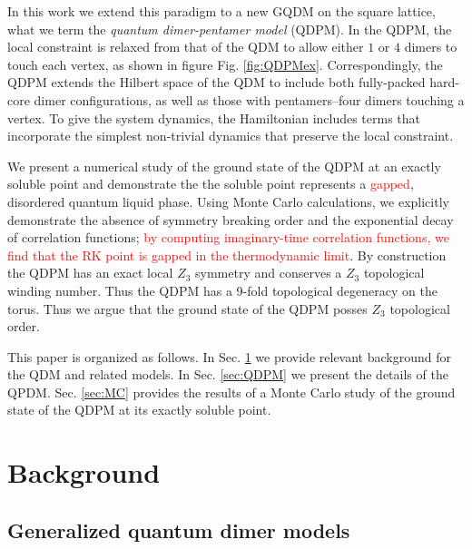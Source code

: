\documentclass[twocolumn,prb,aps,floatfix,superscriptaddress]{revtex4-1}
\newcommand{\figref}[1]{Fig. \ref{#1}}
\newcommand{\secref}[1]{Sec. \ref{#1}}
\begin{document}
In this work we extend this paradigm to a new GQDM on the square lattice, what we term the \emph{quantum dimer-pentamer model} (QDPM). In the QDPM, the local constraint is relaxed from that of the QDM to allow either $1$ or $4$ dimers to touch each vertex, as shown in figure \figref{fig:QDPMex}. Correspondingly, the QDPM extends the Hilbert space of the QDM to include both fully-packed hard-core dimer configurations, as well as those with pentamers--four dimers touching a vertex. To give the system dynamics, the Hamiltonian includes terms that incorporate the simplest non-trivial dynamics that preserve the local constraint.

We present a numerical study of the ground state of the QDPM at an exactly soluble point and demonstrate the the soluble point represents a \textcolor{red}{gapped}, disordered quantum liquid phase.  Using Monte Carlo calculations, we explicitly demonstrate the absence of symmetry breaking order and the exponential decay of correlation functions; \textcolor{red}{by computing imaginary-time correlation functions, we find that the RK point is gapped in the thermodynamic limit}. By construction the QDPM has an exact local $Z_3$ symmetry and conserves a $Z_3$ topological winding number. Thus the QDPM has a 9-fold topological degeneracy on the torus. Thus we argue that the ground state of the QDPM posses $Z_3$ topological order.

This paper is organized as follows. In \secref{sec:Background} we provide relevant background for the QDM and related models. In \secref{sec:QDPM} we present the details of the QPDM. \secref{sec:MC} provides the results of a Monte Carlo study of the ground state of the QDPM at its exactly soluble point.


\section{Background}
\label{sec:Background}

\subsection{Generalized quantum dimer models}
\label{sec:GQDM}
\end{document}
